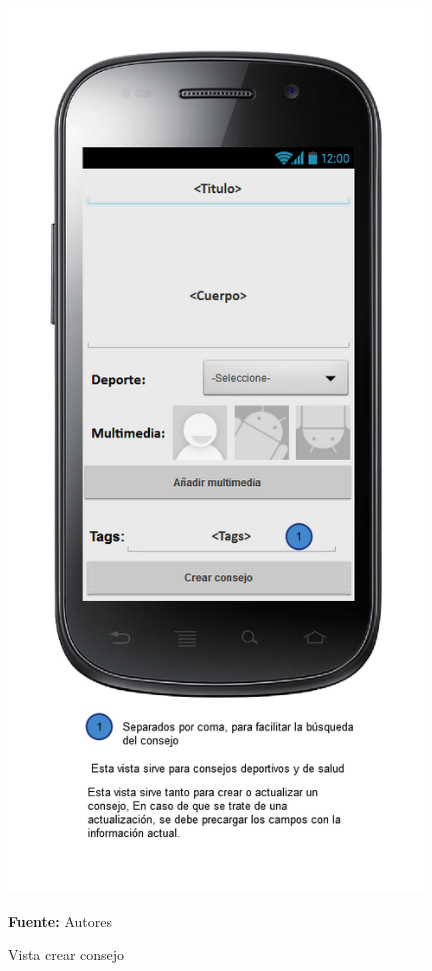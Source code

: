 \begin{figure}[!htb]
  \begin{center}
\includegraphics[width=11cm]{./imagenes/UI/Contenidos/crear_consejo.png}
    \caption{Vista crear consejo}
    \label{fig:Vista_crear_consejo}
    \textbf{Fuente:}  Autores
  \end{center}
\end{figure}
